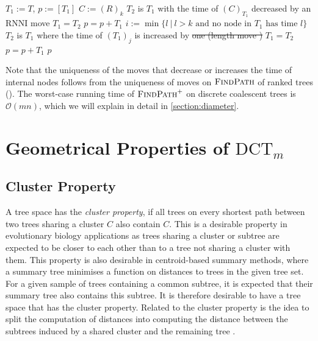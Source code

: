 \documentclass[11pt]{amsart}
\newcommand{\rnni}{\mathrm{RNNI}}
\newcommand{\findpath}{\textsc{FindPath}}
\newcommand{\ntime}{\mathrm{time}}
\newcommand{\dct}{\mathrm{DCT}}
\renewcommand{\O}{\mathcal O}
\newcommand{\summary}[1]{} %
\providecommand{\DIFaddtex}[1]{{\protect\color{blue}\uwave{#1}}} %
\providecommand{\DIFdeltex}[1]{{\protect\color{red}\sout{#1}}}                      %
\providecommand{\DIFaddbegin}{} %
\providecommand{\DIFaddend}{} %
\providecommand{\DIFdelbegin}{} %
\providecommand{\DIFdelend}{} %
\providecommand{\DIFadd}[1]{\texorpdfstring{\DIFaddtex{#1}}{#1}} %
\providecommand{\DIFdel}[1]{\texorpdfstring{\DIFdeltex{#1}}{}} %
\newcommand{\DIFscaledelfig}{0.5}
\newlength{\DIFdelgraphicswidth} %
\newlength{\DIFdelgraphicsheight} %
\newcommand{\DIFaddincludegraphics}[2][]{{\color{blue}\fbox{\DIFOincludegraphics[#1]{#2}}}} %
\newcommand{\DIFdelincludegraphics}[2][]{%
\sbox{\DIFdelgraphicsbox}{\DIFOincludegraphics[#1]{#2}}%
\settoboxwidth{\DIFdelgraphicswidth}{\DIFdelgraphicsbox} %
\settoboxtotalheight{\DIFdelgraphicsheight}{\DIFdelgraphicsbox} %
\scalebox{\DIFscaledelfig}{%
\parbox[b]{\DIFdelgraphicswidth}{\usebox{\DIFdelgraphicsbox}\\[-\baselineskip] \rule{\DIFdelgraphicswidth}{0em}}\llap{\resizebox{\DIFdelgraphicswidth}{\DIFdelgraphicsheight}{%
\setlength{\unitlength}{\DIFdelgraphicswidth}%
\begin{picture}(1,1)%
\thicklines\linethickness{2pt} %
{\color[rgb]{1,0,0}\put(0,0){\framebox(1,1){}}}%
{\color[rgb]{1,0,0}\put(0,0){\line( 1,1){1}}}%
{\color[rgb]{1,0,0}\put(0,1){\line(1,-1){1}}}%
\end{picture}%
}\hspace*{3pt}}} %
} %
\DeclareRobustCommand{\DIFaddbegin}{\DIFOaddbegin \let\includegraphics\DIFaddincludegraphics} %
\DeclareRobustCommand{\DIFaddend}{\DIFOaddend \let\includegraphics\DIFOincludegraphics} %
\DeclareRobustCommand{\DIFdelbegin}{\DIFOdelbegin \let\includegraphics\DIFdelincludegraphics} %
\DeclareRobustCommand{\DIFdelend}{\DIFOaddend \let\includegraphics\DIFOincludegraphics} %
\begin{document}
\begin{algorithm}[h]
	\caption{$\findpath^+$($T,R$)}
	\begin{algorithmic}[1]
		\label{alg:fp_dtt}
		\STATE $T_1 := T$, $p := [T_1]$
		 \label{alg:fp_dtt:for}
			\STATE $C:=(R)_k$
			\WHILE {$\ntime((C)_{T_1})>k$} \label{alg:fp_dtt:while}
					\STATE $T_2$ is $T_1$ with the time of $(C)_{T_1}$ decreased by an $\rnni$ move
				\STATE $T_1 = T_2$
				\STATE $p = p+T_1$
			\ENDWHILE
				\STATE $i := \min\{l \ |\  l>k \text{ and no node in } T_1 \text{ has time }l\}$ \label{line:min_free_time}
				 \label{alg:fp_dtt:nested_for}
					\label{line:length_move}
					\STATE $T_2$ is $T_1$ where the time of $(T_1)_j$ is increased by \DIFdelbegin \DIFdel{one (length move
					)
					}\DIFdelend \DIFaddbegin \DIFadd{a length move
					}\DIFaddend \STATE $T_1 = T_2$
					\STATE $p = p+T_1$
				\ENDFOR
			\ENDIF
		\ENDFOR
		\RETURN $p$
	\end{algorithmic}
\end{algorithm}

Note that the uniqueness of the moves that decrease or increases the time of internal nodes follows from the uniqueness of moves on $\findpath$ of ranked trees (\autocite[Proposition 1]{Collienne2021}).
The worst-case running time of $\findpath^+$ on discrete coalescent trees is $\O(mn)$, which we will explain in detail in \autoref{section:diameter}.

\section{Geometrical Properties of $\dct_m$}
\label{section:geometry}

\subsection{Cluster Property}
\label{section:cluster_property}
\summary{Definition of Cluster Property and why it is relevant (a bit of bio).}
A tree space has the \emph{cluster property}, if all trees on every shortest path between two trees sharing a cluster $C$ also contain $C$.
This is a desirable property in evolutionary biology applications as trees sharing a cluster or subtree are expected to be closer to each other than to a tree not sharing a cluster with them.
This property is also desirable in centroid-based summary methods, where a summary tree minimises a function on distances to trees in the given tree set.
For a given sample of trees containing a common subtree, it is expected that their summary tree also contains this subtree.
It is therefore desirable to have a tree space that has the cluster property.
Related to the cluster property is the idea to split the computation of distances into computing the distance between the subtrees induced by a shared cluster and the remaining tree \autocite{Bordewich2005-nx}.
\end{document}
